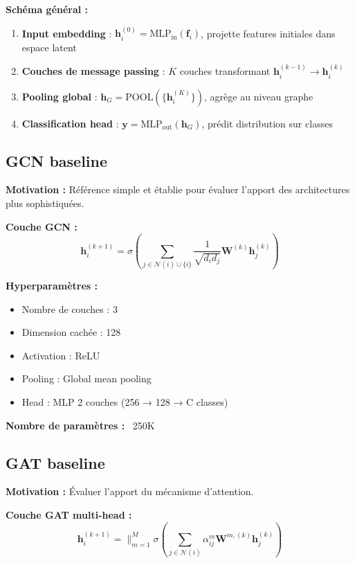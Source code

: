 \textbf{Schéma général :}
\begin{enumerate}
    \item \textbf{Input embedding} : $\mathbf{h}_i^{(0)} = \text{MLP}_{\text{in}}(\mathbf{f}_i)$, projette features initiales dans espace latent
    \item \textbf{Couches de message passing} : $K$ couches transformant $\mathbf{h}_i^{(k-1)} \rightarrow \mathbf{h}_i^{(k)}$
    \item \textbf{Pooling global} : $\mathbf{h}_G = \text{POOL}(\{\mathbf{h}_i^{(K)}\})$, agrège au niveau graphe
    \item \textbf{Classification head} : $\mathbf{y} = \text{MLP}_{\text{out}}(\mathbf{h}_G)$, prédit distribution sur classes
\end{enumerate}

\subsection{GCN baseline}

\textbf{Motivation :}
Référence simple et établie pour évaluer l'apport des architectures plus sophistiquées.

\textbf{Couche GCN :}
\[
\mathbf{h}_i^{(k+1)} = \sigma\left(\sum_{j \in \mathcal{N}(i) \cup \{i\}} \frac{1}{\sqrt{d_i d_j}} \mathbf{W}^{(k)}\mathbf{h}_j^{(k)}\right)
\]

\textbf{Hyperparamètres :}
\begin{itemize}
    \item Nombre de couches : 3
    \item Dimension cachée : 128
    \item Activation : ReLU
    \item Pooling : Global mean pooling
    \item Head : MLP 2 couches (256 → 128 → C classes)
\end{itemize}

\textbf{Nombre de paramètres :} ~250K

\subsection{GAT baseline}

\textbf{Motivation :}
Évaluer l'apport du mécanisme d'attention.

\textbf{Couche GAT multi-head :}
\[
\mathbf{h}_i^{(k+1)} = \|_{m=1}^M \sigma\left(\sum_{j \in \mathcal{N}(i)} \alpha_{ij}^m \mathbf{W}^{m,(k)}\mathbf{h}_j^{(k)}\right)
\]

